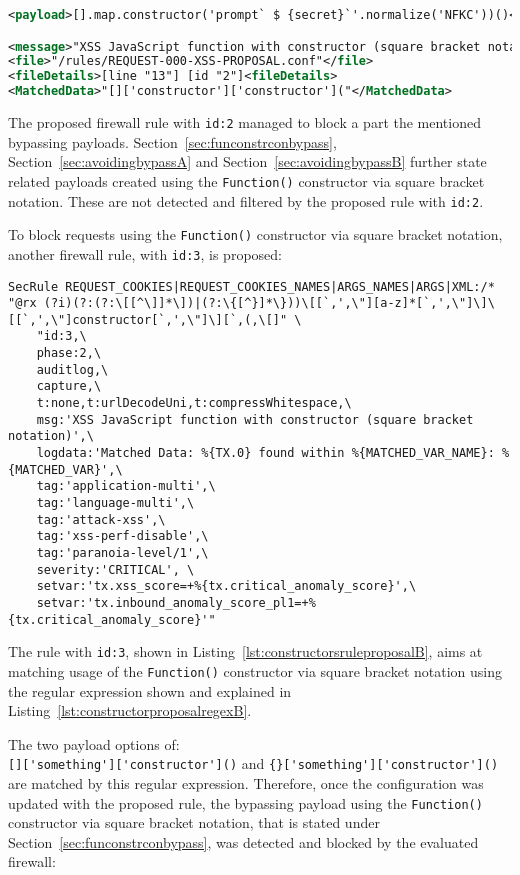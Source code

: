 \begin{lstlisting}[style=ruleStyle, language=XML, caption=Forced Unicode Normalization bypass blocked]
<payload>[].map.constructor('prompt` $ {secret}`'.normalize('NFKC'))()</payload>

<message>"XSS JavaScript function with constructor (square bracket notation)"</message>
<file>"/rules/REQUEST-000-XSS-PROPOSAL.conf"</file>
<fileDetails>[line "13"] [id "2"]<fileDetails>
<MatchedData>"[]['constructor']['constructor']("</MatchedData>
\end{lstlisting}
The proposed firewall rule with \verb|id:2| managed to block a part the mentioned bypassing payloads. Section~\ref{sec:funconstrconbypass}, Section~\ref{sec:avoidingbypassA} and Section~\ref{sec:avoidingbypassB} further state related payloads created using the \verb|Function()| constructor via square bracket notation. These are not detected and filtered by the proposed rule with \verb|id:2|.

To block requests using the \verb|Function()| constructor via square bracket notation, another firewall rule, with \verb|id:3|, is proposed:

\begin{lstlisting}[style=basicStyle, caption=Rule proposal to block usage of Function() constructor in square bracket notation, label={lst:constructorsruleproposalB}]
SecRule REQUEST_COOKIES|REQUEST_COOKIES_NAMES|ARGS_NAMES|ARGS|XML:/* "@rx (?i)(?:(?:\[[^\]]*\])|(?:\{[^}]*\}))\[[`,',\"][a-z]*[`,',\"]\]\[[`,',\"]constructor[`,',\"]\][`,(,\[]" \
    "id:3,\
    phase:2,\
    auditlog,\
    capture,\
    t:none,t:urlDecodeUni,t:compressWhitespace,\
    msg:'XSS JavaScript function with constructor (square bracket notation)',\
    logdata:'Matched Data: %{TX.0} found within %{MATCHED_VAR_NAME}: %{MATCHED_VAR}',\
    tag:'application-multi',\
    tag:'language-multi',\
    tag:'attack-xss',\
    tag:'xss-perf-disable',\
    tag:'paranoia-level/1',\
    severity:'CRITICAL', \
    setvar:'tx.xss_score=+%{tx.critical_anomaly_score}',\
    setvar:'tx.inbound_anomaly_score_pl1=+%{tx.critical_anomaly_score}'"
\end{lstlisting}
The rule with \verb|id:3|, shown in Listing~\ref{lst:constructorsruleproposalB}, aims at matching usage of the \verb|Function()| constructor via square bracket notation using the regular expression shown and explained in Listing~\ref{lst:constructorproposalregexB}.

The two payload options of: \\
\verb|[]['something']['constructor']()| and \verb|{}['something']['constructor']()| \\
are matched by this regular expression. Therefore, once the configuration was updated with the proposed rule, the bypassing payload using the \verb|Function()| constructor via square bracket notation, that is stated under Section~\ref{sec:funconstrconbypass}, was detected and blocked by the evaluated firewall:

